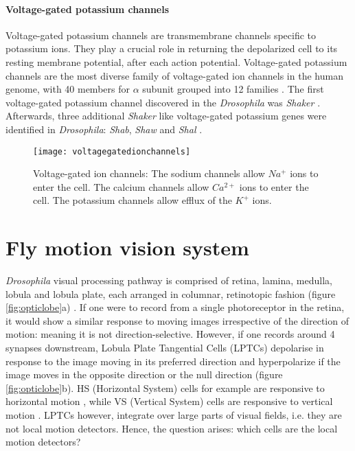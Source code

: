 \paragraph{Voltage-gated potassium channels}
Voltage-gated potassium channels are transmembrane channels specific to potassium ions. They play a crucial role in returning the depolarized cell to its resting membrane potential, after each action potential. Voltage-gated potassium channels are the most diverse family of voltage-gated ion channels in the human genome, with 40 members for $\alpha$ subunit grouped into 12 families \parencite{Gutman2005}. The first voltage-gated potassium channel discovered in the \textit{Drosophila} was \textit{Shaker} \parencite{Papazian1987}. Afterwards, three additional \textit{Shaker} like voltage-gated potassium genes were identified in \textit{Drosophila}: \textit{Shab}, \textit{Shaw} and \textit{Shal} \parencite{Covarrubias1991}. 

\begin{figure}
\centering
\hspace*{-1cm} 
\texttt{[image: voltagegatedionchannels]}
\caption[Voltage-gated ion channels] {Voltage-gated ion channels: The sodium channels allow $Na^{+}$ ions to enter the cell. The calcium channels allow $Ca^{2+}$ ions to enter the cell. The potassium channels allow efflux of the $K^{+}$ ions.}
\label{fig:vgatedionc}
\end{figure}


\section{Fly motion vision system}
\textit{Drosophila} visual processing pathway is comprised of retina, lamina, medulla, lobula and lobula plate, each arranged in columnar, retinotopic fashion (figure \ref{fig:opticlobe}a) \parencite{Fischbach1989}. If one were to record from a single photoreceptor in the retina, it would show a similar response to moving images irrespective of the direction of motion: meaning it is not direction-selective. However, if one records around 4 synapses downstream, Lobula Plate Tangential Cells (LPTCs) depolarise in response to the image moving in its preferred direction and hyperpolarize if the image moves in the opposite direction or the null direction (figure \ref{fig:opticlobe}b). HS (Horizontal System) cells for example are responsive to horizontal motion \parencite{Schnell2010}, while VS (Vertical System) cells are responsive to vertical motion \parencite{Joesch2008}. LPTCs however, integrate over large parts of visual fields, i.e. they are not local motion detectors. Hence, the question arises: which cells are the local motion detectors? 

